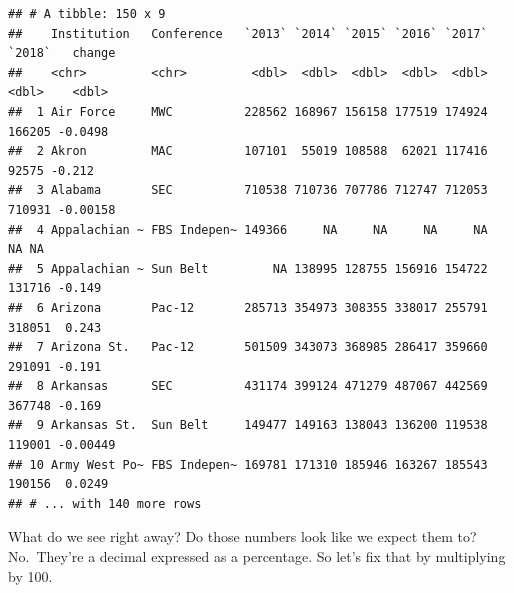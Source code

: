 \documentclass[
]{book}
\newenvironment{Shaded}{\begin{snugshade}}{\end{snugshade}}
\newcommand{\DataTypeTok}[1]{\textcolor[rgb]{0.13,0.29,0.53}{#1}}
\newcommand{\DecValTok}[1]{\textcolor[rgb]{0.00,0.00,0.81}{#1}}
\newcommand{\KeywordTok}[1]{\textcolor[rgb]{0.13,0.29,0.53}{\textbf{#1}}}
\newcommand{\NormalTok}[1]{#1}
\newcommand{\OperatorTok}[1]{\textcolor[rgb]{0.81,0.36,0.00}{\textbf{#1}}}
\newcommand{\StringTok}[1]{\textcolor[rgb]{0.31,0.60,0.02}{#1}}
\begin{document}
\begin{Shaded}
\end{Shaded}

\begin{verbatim}
## # A tibble: 150 x 9
##    Institution   Conference   `2013` `2014` `2015` `2016` `2017` `2018`   change
##    <chr>         <chr>         <dbl>  <dbl>  <dbl>  <dbl>  <dbl>  <dbl>    <dbl>
##  1 Air Force     MWC          228562 168967 156158 177519 174924 166205 -0.0498 
##  2 Akron         MAC          107101  55019 108588  62021 117416  92575 -0.212  
##  3 Alabama       SEC          710538 710736 707786 712747 712053 710931 -0.00158
##  4 Appalachian ~ FBS Indepen~ 149366     NA     NA     NA     NA     NA NA      
##  5 Appalachian ~ Sun Belt         NA 138995 128755 156916 154722 131716 -0.149  
##  6 Arizona       Pac-12       285713 354973 308355 338017 255791 318051  0.243  
##  7 Arizona St.   Pac-12       501509 343073 368985 286417 359660 291091 -0.191  
##  8 Arkansas      SEC          431174 399124 471279 487067 442569 367748 -0.169  
##  9 Arkansas St.  Sun Belt     149477 149163 138043 136200 119538 119001 -0.00449
## 10 Army West Po~ FBS Indepen~ 169781 171310 185946 163267 185543 190156  0.0249 
## # ... with 140 more rows
\end{verbatim}

What do we see right away? Do those numbers look like we expect them to? No.~They're a decimal expressed as a percentage. So let's fix that by multiplying by 100.

\begin{Shaded}
\end{Shaded}
\end{document}
